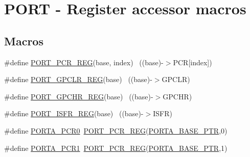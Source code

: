\hypertarget{group___p_o_r_t___register___accessor___macros}{}\section{P\+O\+RT -\/ Register accessor macros}
\label{group___p_o_r_t___register___accessor___macros}
\subsection*{Macros}
\begin{DoxyCompactItemize}
\item 
\#define \hyperlink{group___p_o_r_t___register___accessor___macros_gac6f8c9eab2e63700616f4d4fa4a6ef0e}{P\+O\+R\+T\+\_\+\+P\+C\+R\+\_\+\+R\+EG}(base,  index)                              ~((base)-\/$>$P\+CR\mbox{[}index\mbox{]})
\item 
\#define \hyperlink{group___p_o_r_t___register___accessor___macros_gabbf5476f842aa7b313fdd3fedad41ca1}{P\+O\+R\+T\+\_\+\+G\+P\+C\+L\+R\+\_\+\+R\+EG}(base)                                      ~((base)-\/$>$G\+P\+C\+LR)
\item 
\#define \hyperlink{group___p_o_r_t___register___accessor___macros_ga5436d30f4741eacd3c61c337b626ab55}{P\+O\+R\+T\+\_\+\+G\+P\+C\+H\+R\+\_\+\+R\+EG}(base)                                      ~((base)-\/$>$G\+P\+C\+HR)
\item 
\#define \hyperlink{group___p_o_r_t___register___accessor___macros_gace6266e51916939b6ebd7cdb38394c6f}{P\+O\+R\+T\+\_\+\+I\+S\+F\+R\+\_\+\+R\+EG}(base)                                        ~((base)-\/$>$I\+S\+FR)
\item 
\#define \hyperlink{group___p_o_r_t___register___accessor___macros_gaf09680dfe5ed3f1f4df46364406b5d65}{P\+O\+R\+T\+A\+\_\+\+P\+C\+R0}~\hyperlink{group___p_o_r_t___register___accessor___macros_gac6f8c9eab2e63700616f4d4fa4a6ef0e}{P\+O\+R\+T\+\_\+\+P\+C\+R\+\_\+\+R\+EG}(\hyperlink{group___p_o_r_t___peripheral_gaa18ec7594fe603225220ec6eda4a19ce}{P\+O\+R\+T\+A\+\_\+\+B\+A\+S\+E\+\_\+\+P\+TR},0)
\item 
\#define \hyperlink{group___p_o_r_t___register___accessor___macros_gaa0028ded7cfc5ec26b8736ce6b6cab1d}{P\+O\+R\+T\+A\+\_\+\+P\+C\+R1}~\hyperlink{group___p_o_r_t___register___accessor___macros_gac6f8c9eab2e63700616f4d4fa4a6ef0e}{P\+O\+R\+T\+\_\+\+P\+C\+R\+\_\+\+R\+EG}(\hyperlink{group___p_o_r_t___peripheral_gaa18ec7594fe603225220ec6eda4a19ce}{P\+O\+R\+T\+A\+\_\+\+B\+A\+S\+E\+\_\+\+P\+TR},1)

\end{DoxyCompactItemize}

